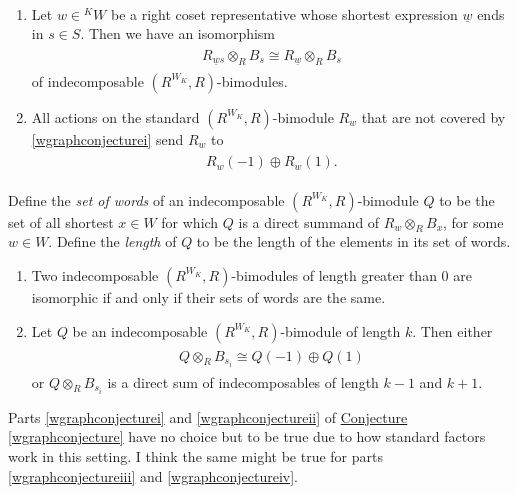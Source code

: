 \noindent\begin{conjecture}\label{wgraphconjecture}\ 
\begin{enumerate}[label=\textup{(\roman*).}, ref=\textup{(\roman*)}, leftmargin=4\parindent]
\item\label{wgraphconjecturei} Let $w \in {}^KW$ be a right coset representative whose shortest expression $\underline{w}$ ends in $s \in S$. Then we have an isomorphism
\begin{align*}
\begin{split}
R_{\underline{w}s} \otimes_R B_s \cong R_{\underline{w}} \otimes_R B_s
\end{split}
\end{align*}
of indecomposable $(R^{W_K}, R)$-bimodules.
\item\label{wgraphconjectureii} All actions on the standard $(R^{W_K}, R)$-bimodule $R_w$ that are not covered by \ref{wgraphconjecturei} send $R_w$ to
\begin{align*}
\begin{split}
R_w(-1) \oplus R_w(1).
\end{split}
\end{align*}
\end{enumerate}
\noindent Define the {\em set of words} of an indecomposable $(R^{W_K}, R)$-bimodule $Q$ to be the set of all shortest $x \in W$ for which $Q$ is a direct summand of $R_w \otimes_R B_x$, for some $w \in W$. Define the {\em length} of $Q$ to be the length of the elements in its set of words.
\begin{enumerate}[label=\textup{(\roman*).}, ref=\textup{(\roman*)}, start=3, leftmargin=4\parindent]
\item\label{wgraphconjectureiii} Two indecomposable $(R^{W_K}, R)$-bimodules of length greater than $0$ are isomorphic if and only if their sets of words are the same.
\item\label{wgraphconjectureiv} Let $Q$ be an indecomposable $(R^{W_K}, R)$-bimodule of length $k$. Then either
\begin{align*}
\begin{split}
Q \otimes_R B_{s_i} \cong Q(-1) \oplus Q(1)
\end{split}
\end{align*}
or $Q \otimes_R B_{s_i}$ is a direct sum of indecomposables of length $k-1$ and $k+1$.\\
\end{enumerate}
\end{conjecture}

\noindent Parts \ref{wgraphconjecturei} and \ref{wgraphconjectureii} of \hyperref[wgraphconjecture]{Conjecture \ref*{wgraphconjecture}} have no choice but to be true due to how standard factors work in this setting. I think the same might be true for parts \ref{wgraphconjectureiii} and \ref{wgraphconjectureiv}.
\newpage

